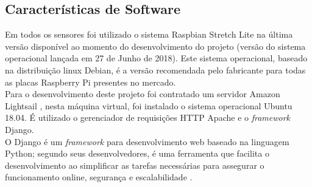 \subsection{Características de Software}
\quad Em todos os sensores foi utilizado o sistema Raspbian Stretch Lite na última versão disponível ao momento do desenvolvimento do projeto (versão do sistema operacional lançada em 27 de Junho de 2018).
Este sistema operacional, baseado na distribuição linux Debian, é a versão recomendada pelo fabricante para todas as placas Raspberry Pi presentes no mercado.
\\\null\quad Para o desenvolvimento deste projeto foi contratado um servidor Amazon Lightsail \cite{lightsail}, nesta máquina virtual, foi instalado o sistema operacional Ubuntu 18.04. É utilizado o gerenciador de requisições HTTP Apache e o \textit{framework} Django.
\\\null\quad O Django é um \textit{framework} para desenvolvimento web baseado na linguagem Python; segundo seus desenvolvedores, é uma ferramenta que facilita o desenvolvimento ao simplificar as tarefas necessárias para assegurar o funcionamento online, segurança e escalabilidade \cite{django}.

